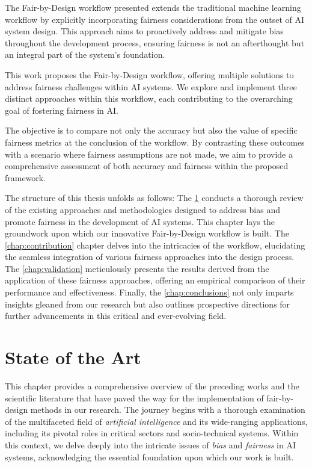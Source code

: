 \documentclass[12pt,a4paper,openright,twoside]{book}
\begin{document}
The Fair-by-Design workflow presented extends the traditional machine learning workflow by explicitly incorporating fairness considerations from the outset of AI system design. This approach aims to proactively address and mitigate bias throughout the development process, ensuring fairness is not an afterthought but an integral part of the system's foundation.

This work proposes the Fair-by-Design workflow, offering multiple solutions to address fairness challenges within AI systems. We explore and implement three distinct approaches within this workflow, each contributing to the overarching goal of fostering fairness in AI.

The objective is to compare not only the accuracy but also the value of specific fairness metrics at the conclusion of the workflow. By contrasting these outcomes with a scenario where fairness assumptions are not made, we aim to provide a comprehensive assessment of both accuracy and fairness within the proposed framework.

The structure of this thesis unfolds as follows: The \cref{chap:background} conducts a thorough review of the existing approaches and methodologies designed to address bias and promote fairness in the development of AI systems. This chapter lays the groundwork upon which our innovative Fair-by-Design workflow is built. The \cref{chap:contribution} chapter delves into the intricacies of the workflow, elucidating the seamless integration of various fairness approaches into the design process. The \cref{chap:validation} meticulously presents the results derived from the application of these fairness approaches, offering an empirical comparison of their performance and effectiveness. Finally, the \cref{chap:conclusions} not only imparts insights gleaned from our research but also outlines prospective directions for further advancements in this critical and ever-evolving field.

\chapter{State of the Art} %
\label{chap:background}

This chapter provides a comprehensive overview of the preceding works and the scientific literature that have paved the way for the implementation of fair-by-design methods in our research. The journey begins with a thorough examination of the multifaceted field of \emph{artificial intelligence} and its wide-ranging applications, including its pivotal roles in critical sectors and socio-technical systems. Within this context, we delve deeply into the intricate issues of \emph{bias} and \emph{fairness} in AI systems, acknowledging the essential foundation upon which our work is built. 
\end{document}
